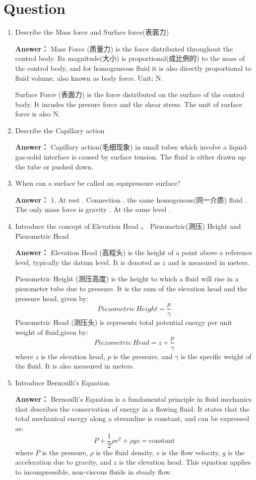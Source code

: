 \documentclass[12pt,a4paper]{article}
\newcounter{question}
\newenvironment{questions}{
    \setcounter{question}{0}
    \section*{Question}
    \begin{enumerate}[leftmargin=1.5em,label={\arabic*．}]
}{
    \end{enumerate}
}
\newcommand{\answer}[1]{\par\noindent\textbf{Answer：} #1\par\vspace{1em}}
\begin{document}
\begin{questions}
  \item Describe the Mass force and Surface force(表面力)
  
  \answer{
    Mass Force (质量力) is the force distributed throughout the control body. Its magnitude(大小) is proportional(成比例的) to the mass of the control body, and for homogeneous fluid it is also directly proportional to fluid volume, also known as body force. Unit: N.
  
    Surface Force (表面力) is the force distributed on the surface of the control body. It incudes the presure force and the shear stress.  The unit of surface force is also N.
    }

    \item Describe the Capillary action
    
    \answer{
      Capillary action(毛细现象) in small tubes which involve a liquid-gas-solid interface is caused by surface tension. The fluid is either drawn up the tube or pushed down.
    }

    \item When can a surface be called an equipressure surface?
    
    \answer{
      1. At rest . Connection . the same homogenous(同一介质) fluid \quad 4. The only mass force is gravity \quad 5. At the same level .
    }

    \item Introduce the concept of  Elevation Head 、 Piezometric(测压) Height  and Piezometric Head 

    \answer{
      Elevation Head (高程头) is the height of a point above a reference level, typically the datum level. It is denoted as $z$ and is measured in meters.

      Piezometric Height (测压高度) is the height to which a fluid will rise in a piezometer tube due to pressure. It is the sum of the elevation head and the pressure head, given by:
      \[
      Piezometric \ Height = \frac{p}{\gamma}
      \]
      Piezometric Head (测压头) is represents total potential energy 
per unit weight of fluid,given by:
      \[
      Piezometric \ Head = z + \frac{p}{\gamma}
      \]
      where $z$ is the elevation head, $p$ is the pressure, and $\gamma$ is the specific weight of the fluid. It is also measured in meters.
    }

  \item Introduce Bernoulli's Equation
  
  \answer{
    Bernoulli's Equation is a fundamental principle in fluid mechanics that describes the conservation of energy in a flowing fluid. It states that the total mechanical energy along a streamline is constant, and can be expressed as:
    \[
    P + \frac{1}{2} \rho v^2 + \rho g z = \text{constant}
    \]
    where $P$ is the pressure, $\rho$ is the fluid density, $v$ is the flow velocity, $g$ is the acceleration due to gravity, and $z$ is the elevation head. This equation applies to incompressible, non-viscous fluids in steady flow.
  }


\end{questions}
\end{document}
